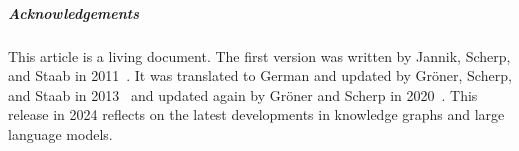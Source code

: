 \documentclass[a4paper,USenglish]{tgdk-v2021}
\begin{document}
\subparagraph*{Acknowledgements}

This article is a living document.
The first version was written by Jannik, Scherp, and Staab in 2011~\cite{DBLP:journals/insk/JanikSS11}.
It was translated to German and updated by Gröner, Scherp, and Staab in 2013~\cite{DBLP:books/ol/13/GronerSS13} and updated again by Gröner and Scherp in 2020~\cite{DBLP:books/degruyter/20/ScherpG20}.
This release in 2024 reflects on the latest developments in knowledge graphs and large language models.


\end{document}
